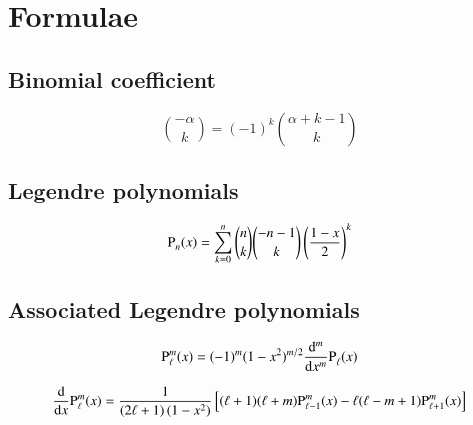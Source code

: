 \appendix

\chapter{Formulae}

\section{Binomial coefficient}
\begin{equation}
\label{appendix:binom}
\binom{-\alpha}{k} = (-1)^k \binom{\alpha+k-1}{k}
\end{equation}


\section{Legendre polynomials}

\begin{equation}
\label{appendix:Pn}
{\text{P}_{n}^{}}(x) = \sum_{k=0}^n \binom{n}{k} \binom{-n-1}{k} \left(\frac{1-x}{2}\right)^k
\end{equation}


\section{Associated Legendre polynomials}

\begin{equation}
\label{appendix:Plm}
{\text{P}_{\ell}^{m}}(x) = (-1)^m (1-x^2)^{m/2} \frac{\mathrm{d}^m}{\mathrm{d}x^m} {\text{P}_{\ell}^{}}(x)
\end{equation}

\begin{equation}
\label{appendix:dPlm}
\frac{\mathrm{d}}{\mathrm{d}x} {\text{P}_{\ell}^{m}}(x) = \frac{1}{(2\ell+1) \, (1-x^2)} \left[ (\ell+1)(\ell+m){\text{P}_{\ell-1}^{m}}(x) - \ell(\ell-m+1){\text{P}_{\ell+1}^{m}}(x) \right]
\end{equation}

\clearpage
{}
\printbibliography


